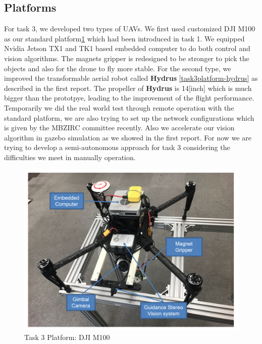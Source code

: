 \documentclass{standalone}
\begin{document}
\subsection{Platforms}
For task 3, we developed two types of UAVs. We first used customized DJI M100 as our standard platform\ref{task3platform-m100} which had been introduced in task 1. We equipped Nvidia Jetson TX1 and TK1 based embedded computer to do both control and vision algorithms. The magnets gripper is redesigned to be stronger to pick the objects and also for the drone to fly more stable. For the second type, we improved the transformable aerial robot called {\bf Hydrus} \ref{task3platform-hydrus} as described in the first report. The propeller of  {\bf Hydrus} is 14[inch] which is much bigger than the prototpye, leading to the improvement of the flight performance. Temporarily we did the real world test through remote operation with the standard platform, we are also trying to set up the network configurations which is given by the MBZIRC committee recently. Also we accelerate our vision algorithm in gazebo simulation as we showed in the first report. For now we are trying to develop a semi-autonomous approach for task 3 considering the difficulties we meet in manually operation.
 \begin{figure}%
    \begin{center}
    \includegraphics[keepaspectratio=true, width=1\linewidth, height=0.3\textheight]
    {sections//task3//images//task3platform.png}
      \end{center}
    \caption{Task 3 Platform: DJI M100}
    \label{task3platform-m100}
    \end{figure}
\end{document}
